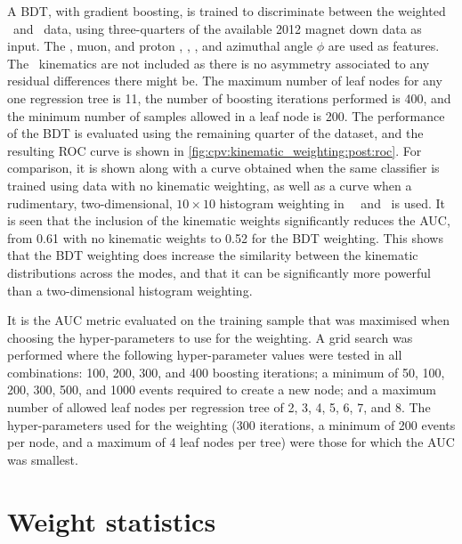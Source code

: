 A \ac{BDT}, with gradient boosting, is trained to discriminate between the
weighted \pKK\ and \ppipi\ data, using three-quarters of the available 2012
magnet down data as input.
The \PLambdab, muon, and proton \ptot, \pT, \Eta, and azimuthal angle $\phi$
are used as features.
The \PLambdac\ kinematics are not included as there is no asymmetry associated
to any residual differences there might be.
The maximum number of leaf nodes for any one regression tree is 11, the number
of boosting iterations performed is 400, and the minimum number of samples
allowed in a leaf node is 200.
The performance of the \ac{BDT} is evaluated using the remaining quarter of the
dataset, and the resulting \ac{ROC} curve is shown in
\cref{fig:cpv:kinematic_weighting:post:roc}.
For comparison, it is shown along with a curve obtained when the same
classifier is trained using data with no kinematic weighting, as well as a
curve when a rudimentary, two-dimensional, $10\times10$ histogram weighting in
\PLambdac\ \pT\ and \Eta\ is used.
It is seen that the inclusion of the kinematic weights significantly reduces
the \ac{AUC}, from 0.61 with no kinematic weights to 0.52 for the \ac{BDT}
weighting.
This shows that the \ac{BDT} weighting does increase the similarity between the
kinematic distributions across the modes, and that it can be significantly more
powerful than a two-dimensional histogram weighting.

It is the \ac{AUC} metric evaluated on the training sample that was maximised
when choosing the hyper-parameters to use for the weighting.
A grid search was performed where the following hyper-parameter values were
tested in all combinations: 100, 200, 300, and 400 boosting iterations; a
minimum of 50, 100, 200, 300, 500, and 1000 events required to create a new
node; and a maximum number of allowed leaf nodes per regression tree of 2, 3,
4, 5, 6, 7, and 8.
The hyper-parameters used for the weighting (300 iterations, a minimum of 200
events per node, and a maximum of 4 leaf nodes per tree) were those for which
the \ac{AUC} was smallest.

\section{Weight statistics}
\label{chap:cpv:kinematic_weighting:stats}

